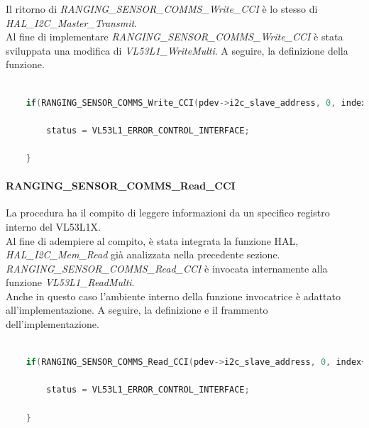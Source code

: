 \documentclass[11pt]{report}
\begin{document}
Il ritorno di \textit{RANGING\_SENSOR\_COMMS\_Write\_CCI} è lo stesso di \textit{HAL\_I2C\_Master\_Transmit}.\\
Al fine di implementare \textit{RANGING\_SENSOR\_COMMS\_Write\_CCI} è stata sviluppata una modifica di \textit{VL53L1\_WriteMulti}.
A seguire, la definizione della funzione.

\begin{lstlisting}[language=Cpp, caption={Dettaglio sull'implementazione di \textit{RANGING\_SENSOR\_COMMS\_Write\_CCI} in \textit{VL53L1\_WriteMulti} }]
    
    if(RANGING_SENSOR_COMMS_Write_CCI(pdev->i2c_slave_address, 0, index+position, pdata+position, data_size) != HAL_OK){
        
        status = VL53L1_ERROR_CONTROL_INTERFACE;

    }

\end{lstlisting}

\paragraph{RANGING\_SENSOR\_COMMS\_Read\_CCI}
La procedura ha il compito di leggere informazioni da un specifico registro interno del VL53L1X.\\
Al fine di adempiere al compito, è stata integrata la funzione HAL, \textit{HAL\_I2C\_Mem\_Read} già analizzata nella precedente sezione.
\textit{RANGING\_SENSOR\_COMMS\_Read\_CCI} è invocata internamente alla funzione \textit{VL53L1\_ReadMulti}.\\
Anche in questo caso l'ambiente interno della funzione invocatrice è adattato all'implementazione.
A seguire, la definizione e il frammento dell'implementazione.

\begin{lstlisting}[language=Cpp, caption={Dettaglio sull'implementazione di \textit{RANGING\_SENSOR\_COMMS\_Read\_CCI} in \textit{VL53L1\_ReadMulti}}]
    
    if(RANGING_SENSOR_COMMS_Read_CCI(pdev->i2c_slave_address, 0, index+position, pData+position, data_size) != HAL_OK){

        status = VL53L1_ERROR_CONTROL_INTERFACE;

    }

\end{lstlisting}
\end{document}
